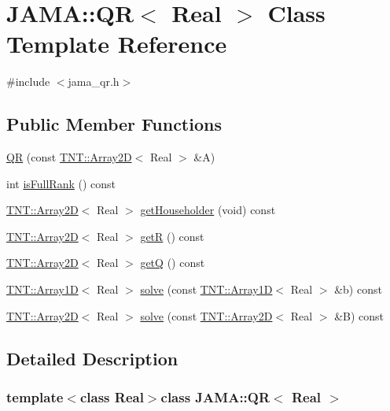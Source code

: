 \hypertarget{classJAMA_1_1QR}{\section{J\-A\-M\-A\-:\-:Q\-R$<$ Real $>$ Class Template Reference}
\label{classJAMA_1_1QR}
}


{\ttfamily \#include $<$jama\-\_\-qr.\-h$>$}

\subsection*{Public Member Functions}
\begin{DoxyCompactItemize}
\item 
\hyperlink{classJAMA_1_1QR_a16e598f3853303908c9956801b2f4f9b}{Q\-R} (const \hyperlink{classTNT_1_1Array2D}{T\-N\-T\-::\-Array2\-D}$<$ Real $>$ \&A)
\item 
int \hyperlink{classJAMA_1_1QR_a0cd45f70cc469e03f8042583ecc1c073}{is\-Full\-Rank} () const 
\item 
\hyperlink{classTNT_1_1Array2D}{T\-N\-T\-::\-Array2\-D}$<$ Real $>$ \hyperlink{classJAMA_1_1QR_ab4492a1039efc813b129e08d7ffd630e}{get\-Householder} (void) const 
\item 
\hyperlink{classTNT_1_1Array2D}{T\-N\-T\-::\-Array2\-D}$<$ Real $>$ \hyperlink{classJAMA_1_1QR_adcc1fea05c9bfbe16eca617488809320}{get\-R} () const 
\item 
\hyperlink{classTNT_1_1Array2D}{T\-N\-T\-::\-Array2\-D}$<$ Real $>$ \hyperlink{classJAMA_1_1QR_af26cc81e42efdb4d46361b575e8c3f4b}{get\-Q} () const 
\item 
\hyperlink{classTNT_1_1Array1D}{T\-N\-T\-::\-Array1\-D}$<$ Real $>$ \hyperlink{classJAMA_1_1QR_ae21196cd1aeecad323ade468dd8d4af8}{solve} (const \hyperlink{classTNT_1_1Array1D}{T\-N\-T\-::\-Array1\-D}$<$ Real $>$ \&b) const 
\item 
\hyperlink{classTNT_1_1Array2D}{T\-N\-T\-::\-Array2\-D}$<$ Real $>$ \hyperlink{classJAMA_1_1QR_a48cbe600fd6a8754a33fc382fc16d2a9}{solve} (const \hyperlink{classTNT_1_1Array2D}{T\-N\-T\-::\-Array2\-D}$<$ Real $>$ \&B) const 
\end{DoxyCompactItemize}


\subsection{Detailed Description}
\subsubsection*{template$<$class Real$>$class J\-A\-M\-A\-::\-Q\-R$<$ Real $>$}


